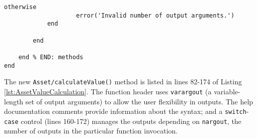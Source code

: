 \begin{lstlisting}[style=Matlab-editor, caption={The \texttt{Asset} class with a new \texttt{calculateValue()} method.}, label={lst:AssetValueCalculation}]
                otherwise
                    error('Invalid number of output arguments.')
            end
            
        end
        
    end % END: methods
end
\end{lstlisting}

The new \texttt{Asset/calculateValue()} method is listed in lines 82-174 of Listing \ref{lst:AssetValueCalculation}.  The function header uses \texttt{varargout} (a variable-length set of output arguments) to allow the user flexibility in outputs. The help documentation comments provide information about the syntax; and a \texttt{switch}-\texttt{case} control (lines 160-172) manages the outputs depending on \texttt{nargout}, the number of outputs  in the particular function invocation.

